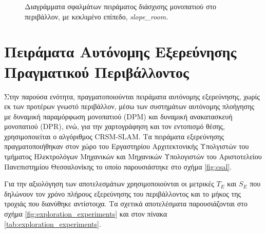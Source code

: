 \begin{figure}[!ht]
	\caption{Διαγράμματα σφαλμάτων πειράματος διάσχισης μονοπατιού στο περιβάλλον, με κεκλιμένο επίπεδο, \textit{slope{\_}room.}}
	\label{fig:slope_room_errors}
\end{figure}

\FloatBarrier

\section{Πειράματα Αυτόνομης Εξερεύνησης Πραγματικού Περιβάλλοντος} \label{exploration_experiments}
Στην παρούσα ενότητα, πραγματοποιούνται πειράματα αυτόνομης εξερεύνησης, χωρίς εκ των προτέρων  γνωστό περιβάλλον, μέσω των συστημάτων αυτόνομης πλοήγησης με δυναμική παραμόρφωση μονοπατιού (DPM) και δυναμική ανακατασκευή μονοπατιού (DPR), ενώ, για την χαρτογράφηση και τον εντοπισμό θέσης, χρησιμοποιείται ο αλγόριθμος CRSM-SLAM. Τα πειράματα εξερεύνησης πραγματοποιήθηκαν στον χώρο του Εργαστηρίου Αρχιτεκτονικής Υπολγιστών του τμήματος Ηλεκτρολόγων Μηχανικών και Μηχανικών Υπολογιστών του Αριστοτελείου Πανεπιστημίου Θεσσαλονίκης το οποίο παρουσιάστηκε στο σχήμα \ref{fig:csal}.

\bigskip
Για την αξιολόγηση των αποτελεσμάτων χρησιμοποιούνται οι μετρικές $T_{E}$ και $S_{E}$ που δηλώνουν τον χρόνο πλήρους εξερεύνησης του περιβάλλοντος και το μήκος της τροχιάς που διανύθηκε αντίστοιχα. Τα σχετικά αποτελέσματα παρουσιάζονται στο σχήμα \ref{fig:exploration_experiments} και στον πίνακα \ref{tab:exploration_experiments}.

